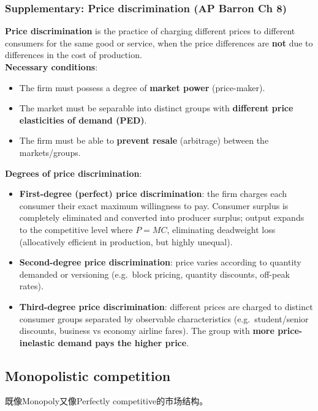 \documentclass[a4paper,12pt]{article}
\newcommand{\needbold}[1]{\textcolor{red!70!black}{\textbf{#1}}}
\begin{document}
\subsubsection*{Supplementary: Price discrimination (AP Barron Ch 8)}
\needbold{Price discrimination} is the practice of charging different prices to different consumers for the same good or service, when the price differences are \textbf{not} due to differences in the cost of production.
\\\textbf{Necessary conditions}:
\begin{itemize}
  \item The firm must possess a degree of \textbf{market power} (price-maker).
  \item The market must be separable into distinct groups with \textbf{different price elasticities of demand (PED)}.
  \item The firm must be able to \textbf{prevent resale} (arbitrage) between the markets/groups.
\end{itemize}
\textbf{Degrees of price discrimination}:
\begin{itemize}
  \item \textbf{First-degree (perfect) price discrimination}: the firm charges each consumer their exact maximum willingness to pay. Consumer surplus is completely eliminated and converted into producer surplus; output expands to the competitive level where $P = MC$, eliminating deadweight loss (allocatively efficient in production, but highly unequal).
  \item \textbf{Second-degree price discrimination}: price varies according to quantity demanded or versioning (e.g.\ block pricing, quantity discounts, off-peak rates).
  \item \textbf{Third-degree price discrimination}: different prices are charged to distinct consumer groups separated by observable characteristics (e.g.\ student/senior discounts, business vs economy airline fares). The group with \textbf{more price-inelastic demand pays the higher price}.
\end{itemize}
\subsection{Monopolistic competition}
既像Monopoly又像Perfectly competitive的市场结构。
\end{document}
